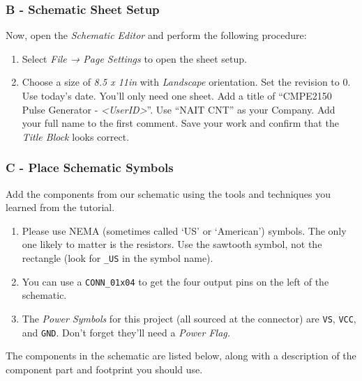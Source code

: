 \documentclass[
  letterpaper,
  DIV=11,
  numbers=noendperiod,
  oneside]{scrartcl}
\begin{document}
\subsubsection{B - Schematic Sheet
Setup}\label{b---schematic-sheet-setup}

Now, open the \emph{Schematic Editor} and perform the following
procedure:

\begin{enumerate}
\def\labelenumi{\arabic{enumi}.}
\item
  Select \emph{File → Page Settings} to open the sheet setup.
\item
  Choose a size of \emph{8.5 x 11in} with \emph{Landscape} orientation.
  Set the revision to 0. Use today's date. You'll only need one sheet.
  Add a title of ``CMPE2150 Pulse Generator -
  \emph{\textless UserID\textgreater{}}''.
  Use ``NAIT CNT'' as your Company. Add your full name to the first
  comment. Save your work and confirm that the \emph{Title Block} looks
  correct.
\end{enumerate}

\subsubsection{C - Place Schematic
Symbols}\label{c---place-schematic-symbols}

Add the components from our schematic using the tools and techniques you
learned from the tutorial.

\begin{enumerate}
\def\labelenumi{\arabic{enumi}.}
\item
  Please use NEMA (sometimes called `US' or `American') symbols. The
  only one likely to matter is the resistors. Use the sawtooth symbol,
  not the rectangle (look for \texttt{\_US} in the symbol name).
\item
  You can use a \texttt{CONN\_01x04} to
  get the four output pins on the left of the schematic.
\item
  The \emph{Power Symbols} for this project (all sourced at the
  connector) are \texttt{VS}, \texttt{VCC}, and \texttt{GND}. Don't
  forget they'll need a \emph{Power Flag.}
\end{enumerate}

The components in the schematic are listed below, along with a
description of the component part and footprint you should use.
\end{document}
